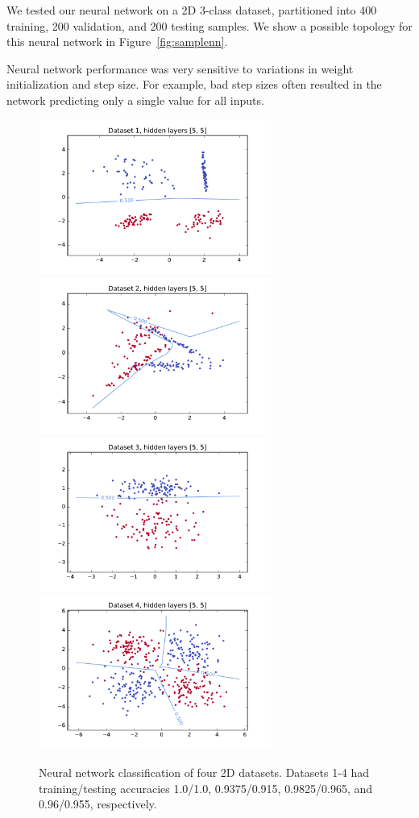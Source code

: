 \documentclass{article}
\begin{document}
\begin{multicols}{2}
We tested our neural network on a 2D 3-class dataset,
partitioned into 400 training, 200 validation, and 200 testing samples.
We show a possible topology for this neural network
in Figure~\ref{fig:samplenn}.

Neural network performance was very sensitive to
variations in weight initialization and step size.
For example, bad step sizes often resulted in
the network predicting only a single value for all inputs.

\begin{figure}
   \centering
   \includegraphics[width=3in]{img/p1/1-200of200.pdf}\hspace{-.25in}
   \includegraphics[width=3in]{img/p1/2-183of200.pdf}
   \includegraphics[width=3in]{img/p1/3-192of200.pdf}\hspace{-.25in}
   \includegraphics[width=3in]{img/p1/4-382of400.pdf}
   \caption{Neural network classification of four 2D datasets.
   Datasets 1-4 had training/testing accuracies 1.0/1.0, 0.9375/0.915, 0.9825/0.965, and 0.96/0.955,
   respectively.
   }
   \label{fig:1-2-classify}
\end{figure}


\end{multicols}
\end{document}
